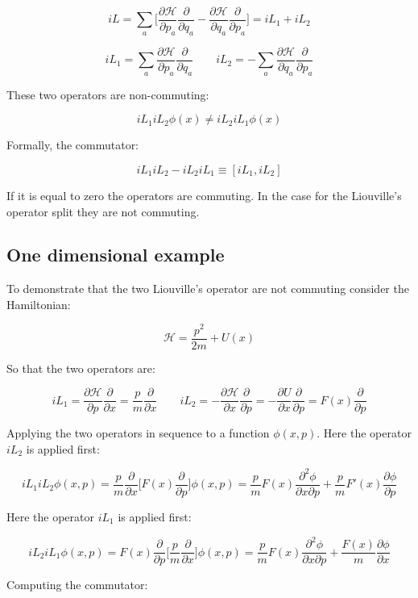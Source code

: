 	$$iL = \sum\limits_a\biggl[\frac{\partial\mathcal{H}}{\partial p_a}\frac{\partial}{\partial q_a} - \frac{\partial\mathcal{H}}{\partial q_a}\frac{\partial}{\partial p_a}\biggr] = iL_1 + iL_2$$

	$$iL_1 = \sum\limits_a\frac{\partial\mathcal{H}}{\partial p_a}\frac{\partial}{\partial q_a} \qquad iL_2 = -\sum\limits_a\frac{\partial\mathcal{H}}{\partial q_a}\frac{\partial}{\partial p_a}$$

	These two operators are non-commuting:

	$$iL_1iL_2\phi(x)\neq iL_2iL_1\phi(x)$$

	Formally, the commutator:

	$$iL_1iL_2-iL_2iL_1\equiv [iL_1, iL_2]$$

	If it is equal to zero the operators are commuting.
	In the case for the Liouville's operator split they are not commuting.

	\subsection{One dimensional example}
	To demonstrate that the two Liouville's operator are not commuting consider the Hamiltonian:

	$$\mathcal{H} = \frac{p^2}{2m} + U(x)$$

	So that the two operators are:

	$$iL_1 = \frac{\partial\mathcal{H}}{\partial p}\frac{\partial}{\partial x} = \frac{p}{m}\frac{\partial}{\partial x}\qquad iL_2 = -\frac{\partial\mathcal{H}}{\partial x}\frac{\partial}{\partial p} = -\frac{\partial U}{\partial x}\frac{\partial}{\partial p} = F(x)\frac{\partial}{\partial p}$$

	Applying the two operators in sequence to a function $\phi(x, p)$.
	Here the operator $iL_2$ is applied first:

	$$iL_1iL_2\phi(x, p) = \frac{p}{m}\frac{\partial}{\partial x}\biggl[F(x)\frac{\partial}{\partial p}\biggr]\phi(x, p) = \frac{p}{m}F(x)\frac{\partial^2\phi}{\partial x\partial p} + \frac{p}{m}F'(x)\frac{\partial\phi}{\partial p}$$

	Here the operator $iL_1$ is applied first:

	$$iL_2iL_1\phi(x, p) = F(x)\frac{\partial}{\partial p}\biggl[\frac{p}{m}\frac{\partial}{\partial x}\biggr]\phi(x, p) = \frac{p}{m}F(x)\frac{\partial^2\phi}{\partial x\partial p} + \frac{F(x)}{m}\frac{\partial \phi}{\partial x}$$

	Computing the commutator:

